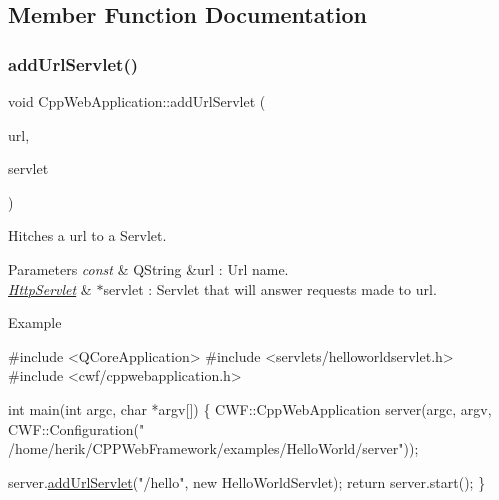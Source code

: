\subsection{Member Function Documentation}
\mbox{\label{class_cpp_web_application_aa8c0b5330f0133fc478b921f2a05dcec}} 
\subsubsection{\texorpdfstring{add\+Url\+Servlet()}{addUrlServlet()}}
{\footnotesize\ttfamily void Cpp\+Web\+Application\+::add\+Url\+Servlet (\begin{DoxyParamCaption}\item[{const Q\+String \&}]{url,  }\item[{\hyperlink{class_http_servlet}{Http\+Servlet} $\ast$}]{servlet }\end{DoxyParamCaption})\hspace{0.3cm}{\ttfamily [inline]}}



Hitches a url to a Servlet. 


\begin{DoxyParams}{Parameters}
{\em const} & Q\+String \&url \+: Url name. \\
\hline
{\em \hyperlink{class_http_servlet}{Http\+Servlet}} & $\ast$servlet \+: Servlet that will answer requests made to url. \\
\hline
\end{DoxyParams}
\begin{DoxyParagraph}{Example}

\begin{DoxyCode}
\textcolor{preprocessor}{#include <QCoreApplication>}
\textcolor{preprocessor}{#include <servlets/helloworldservlet.h>}
\textcolor{preprocessor}{#include <cwf/cppwebapplication.h>}

\textcolor{keywordtype}{int} main(\textcolor{keywordtype}{int} argc, \textcolor{keywordtype}{char} *argv[])
\{
     CWF::CppWebApplication server(argc, argv, CWF::Configuration(\textcolor{stringliteral}{"
      /home/herik/CPPWebFramework/examples/HelloWorld/server"}));

     server.\hyperlink{class_cpp_web_server_ae94dcf116776b97ec7d5a00cde87c6bd}{addUrlServlet}(\textcolor{stringliteral}{"/hello"}, \textcolor{keyword}{new} HelloWorldServlet);
     \textcolor{keywordflow}{return} server.start();
\}
\end{DoxyCode}
 
\end{DoxyParagraph}
\mbox{\label{class_cpp_web_application_a1e9f2c789934748d6b7c29ad33e9d7c9}} 
